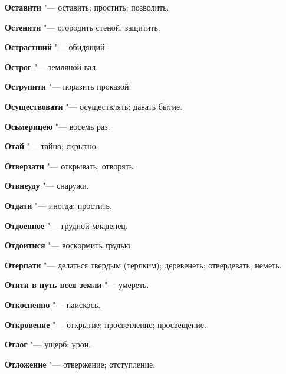 \begin{mymulticols}{2}
\noindent\textbf{Оставити} "--- оставить; простить; позволить. 




\noindent\textbf{Остенити} "--- огородить стеной, защитить. 




\noindent\textbf{Острастший} "--- обидящий. 




\noindent\textbf{Острог} "--- земляной вал. 




\noindent\textbf{Острупити} "--- поразить проказой. 




\noindent\textbf{Осуществовати} "--- осуществлять; давать бытие. 




\noindent\textbf{Осьмерицею} "--- восемь раз. 




\noindent\textbf{Отай} "--- тайно; скрытно. 




\noindent\textbf{Отверзати} "--- открывать; отворять. 




\noindent\textbf{Отвнеуду} "--- снаружи. 




\noindent\textbf{Отдати} "--- иногда: простить. 




\noindent\textbf{Отдоенное} "--- грудной младенец. 




\noindent\textbf{Отдоитися} "--- воскормить грудью. 




\noindent\textbf{Отерпати} "--- делаться твердым (терпким); деревенеть; отвердевать; неметь. 




\noindent\textbf{Отити в путь всея земли} "--- умереть. 




\noindent\textbf{Откосненно} "--- наискось. 




\noindent\textbf{Откровение} "--- открытие; просветление; просвещение. 




\noindent\textbf{Отлог} "--- ущерб; урон. 




\noindent\textbf{Отложение} "--- отвержение; отступление. 





\end{mymulticols}
